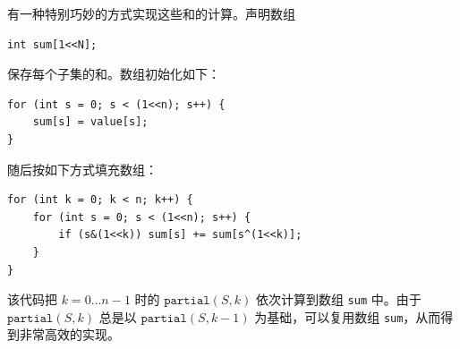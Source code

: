 有一种特别巧妙的方式实现这些和的计算。声明数组
\begin{lstlisting}
int sum[1<<N];
\end{lstlisting}
保存每个子集的和。数组初始化如下：
\begin{lstlisting}
for (int s = 0; s < (1<<n); s++) {
    sum[s] = value[s];
}
\end{lstlisting}
随后按如下方式填充数组：
\begin{lstlisting}
for (int k = 0; k < n; k++) {
    for (int s = 0; s < (1<<n); s++) {
        if (s&(1<<k)) sum[s] += sum[s^(1<<k)];
    }
}
\end{lstlisting}
该代码把 $k=0\ldots n-1$ 时的 $\texttt{partial}(S,k)$ 依次计算到数组 \texttt{sum} 中。由于 $\texttt{partial}(S,k)$ 总是以 $\texttt{partial}(S,k-1)$ 为基础，可以复用数组 \texttt{sum}，从而得到非常高效的实现。
